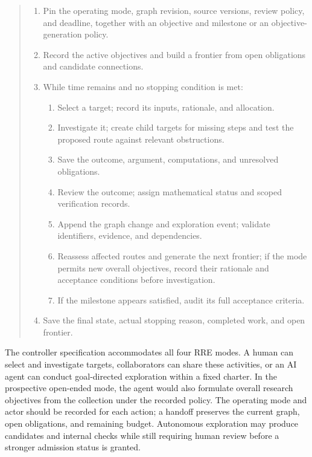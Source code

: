 \begin{quote}\small
\begin{enumerate}[leftmargin=1.8em]
\item Pin the operating mode, graph revision, source versions, review policy, and deadline, together with an objective and milestone or an objective-generation policy.
\item Record the active objectives and build a frontier from open obligations and candidate connections.
\item While time remains and no stopping condition is met:
  \begin{enumerate}[label=\alph*.,leftmargin=1.6em]
  \item Select a target; record its inputs, rationale, and allocation.
  \item Investigate it; create child targets for missing steps and test the proposed route against relevant obstructions.
  \item Save the outcome, argument, computations, and unresolved obligations.
  \item Review the outcome; assign mathematical status and scoped verification records.
  \item Append the graph change and exploration event; validate identifiers, evidence, and dependencies.
  \item Reassess affected routes and generate the next frontier; if the mode permits new overall objectives, record their rationale and acceptance conditions before investigation.
  \item If the milestone appears satisfied, audit its full acceptance criteria.
  \end{enumerate}
\item Save the final state, actual stopping reason, completed work, and open frontier.
\end{enumerate}
\end{quote}

The controller specification accommodates all four RRE modes. A human can select and investigate targets, collaborators can share these activities, or an AI agent can conduct goal-directed exploration within a fixed charter. In the prospective open-ended mode, the agent would also formulate overall research objectives from the collection under the recorded policy. The operating mode and actor should be recorded for each action; a handoff preserves the current graph, open obligations, and remaining budget. Autonomous exploration may produce candidates and internal checks while still requiring human review before a stronger admission status is granted.

